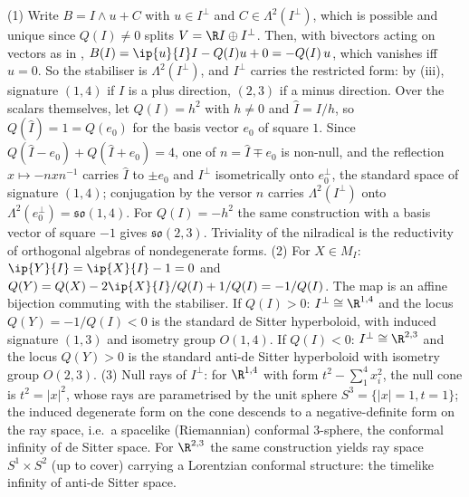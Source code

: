 (1) Write $B = I \wedge u + C$ with $u \in I^\perp$ and $C \in \Lambda^2(I^\perp)$, which is possible and unique since $Q(I) \neq 0$ splits $V = \R I \oplus I^\perp$. Then, with bivectors acting on vectors as in , $B(I) = \ip{u}{I}I - Q(I)u + 0 = -Q(I)\,u$, which vanishes iff $u = 0$. So the stabiliser is $\Lambda^2(I^\perp)$, and $I^\perp$ carries the restricted form: by (iii), signature $(1,4)$ if $I$ is a plus direction, $(2,3)$ if a minus direction. Over the scalars themselves, let $Q(I) = h^{2}$ with $h \neq 0$ and $\hat I = I/h$, so $Q(\hat I) = 1 = Q(e_{0})$ for the basis vector $e_{0}$ of square $1$. Since $Q(\hat I - e_{0}) + Q(\hat I + e_{0}) = 4$, one of $n = \hat I \mp e_{0}$ is non-null, and the reflection $x \mapsto -n x n^{-1}$ carries $\hat I$ to $\pm e_{0}$ and $I^\perp$ isometrically onto $e_{0}^\perp$, the standard space of signature $(1,4)$; conjugation by the versor $n$ carries $\Lambda^2(I^\perp)$ onto $\Lambda^2(e_{0}^\perp) = \mathfrak{so}(1,4)$. For $Q(I) = -h^{2}$ the same construction with a basis vector of square $-1$ gives $\mathfrak{so}(2,3)$. Triviality of the nilradical is the reductivity of orthogonal algebras of nondegenerate forms. (2) For $X \in M_I$: $\ip{Y}{I} = \ip{X}{I} - 1 = 0$ and $Q(Y) = Q(X) - 2\ip{X}{I}/Q(I) + 1/Q(I) = -1/Q(I)$. The map is an affine bijection commuting with the stabiliser. If $Q(I) > 0$: $I^\perp \cong \R^{1,4}$ and the locus $Q(Y) = -1/Q(I) < 0$ is the standard de Sitter hyperboloid, with induced signature $(1,3)$ and isometry group $O(1,4)$. If $Q(I) < 0$: $I^\perp \cong \R^{2,3}$ and the locus $Q(Y) > 0$ is the standard anti-de Sitter hyperboloid with isometry group $O(2,3)$. (3) Null rays of $I^\perp$: for $\R^{1,4}$ with form $t^2 - \sum_1^4 x_i^2$, the null cone is $t^2 = |x|^2$, whose rays are parametrised by the unit sphere $S^3 = \{|x| = 1, t = 1\}$; the induced degenerate form on the cone descends to a negative-definite form on the ray space, i.e.\ a spacelike (Riemannian) conformal $3$-sphere, the conformal infinity of de Sitter space. For $\R^{2,3}$ the same construction yields ray space $S^1 \times S^2$ (up to cover) carrying a Lorentzian conformal structure: the timelike infinity of anti-de Sitter space.
